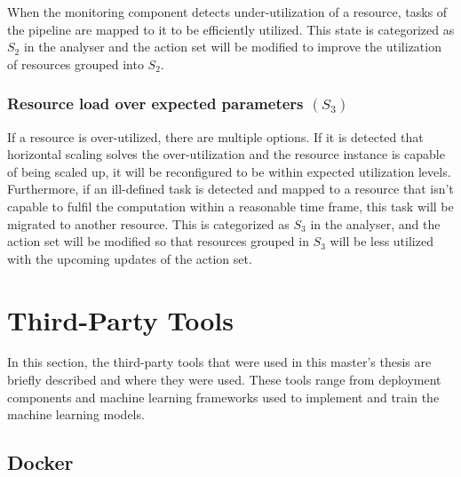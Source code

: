       When the monitoring component detects under-utilization of a resource, tasks of the pipeline are mapped to it to be efficiently utilized. This state is categorized as $S_2$ in the analyser and the action set will be modified to improve the utilization of resources grouped into $S_2$. 

    \subsubsection*{Resource load over expected parameters $(S_3)$} 

      If a resource is over-utilized, there are multiple options. If it is detected that horizontal scaling solves the over-utilization and the resource instance is capable of being scaled up, it will be reconfigured to be within expected utilization levels. Furthermore, if an ill-defined task is detected and mapped to a resource that isn't capable to fulfil the computation within a reasonable time frame, this task will be migrated to another resource. 
      This is categorized as $S_3$ in the analyser, and the action set will be modified so that resources grouped in $S_3$ will be less utilized with the upcoming updates of the action set. \cite{kimovskiBigDataPipeline2022}




\section{Third-Party Tools}
\label{sec:third-party-tools-architecture}

  In this section, the third-party tools that were used in this master's thesis are briefly described and where they were used.
  These tools range from deployment components and machine learning frameworks used to implement and train the machine learning models.

\subsection{Docker}
\label{sec:docker-third-party}


